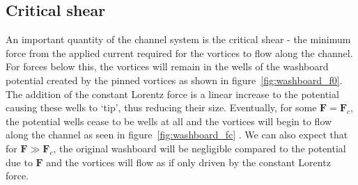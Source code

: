 \documentclass{article}
\numberwithin{equation}{section}
\begin{document}
\subsection{Critical shear} \label{sec:critical_shear}
An important quantity of the channel system is the critical shear - the minimum force from the applied current required for the vortices to flow along the channel. For forces below this, the vortices will remain in the wells of the washboard potential created by the pinned vortices as shown in figure~\ref{fig:washboard_f0}. The addition of the constant Lorentz force is a linear increase to the potential causing these wells to `tip', thus reducing their size. Eventually, for some $\mathbf{F}=\mathbf{F}_c$, the potential wells cease to be wells at all and the vortices will begin to flow along the channel as seen in figure~\ref{fig:washboard_fc} \cite{Gartlan2020NovelFibres, Watkins2016DensitySuperconductors}. We can also expect that for $\mathbf{F}\gg\mathbf{F}_c$, the original washboard will be negligible compared to the potential due to $\mathbf{F}$ and the vortices will flow as if only driven by the constant Lorentz force.
\end{document}
